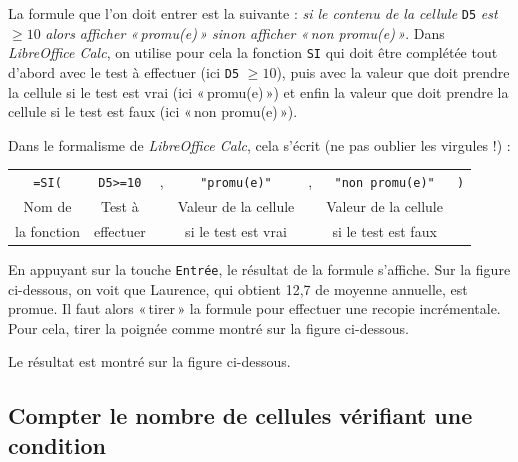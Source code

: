 
La formule que l'on doit entrer est la suivante : \textsl{si le contenu de la cellule} \texttt{D5} \textsl{est} $\geqslant 10$ \textsl{alors afficher «\,promu(e)\,» sinon afficher «\,non promu(e)\,»}. Dans \emph{LibreOffice Calc}, on utilise pour cela la fonction \texttt{SI} qui doit être complétée tout d'abord avec le test à effectuer (ici \texttt{D5} $\geqslant 10$), puis avec la valeur que doit prendre la cellule si le test est vrai (ici «\,promu(e)\,») et enfin la valeur que doit prendre la cellule si le test est faux (ici «\,non promu(e)\,»).

\vspace{1em}

Dans le formalisme de \emph{LibreOffice Calc}, cela s'écrit (ne pas oublier les virgules !) :

\begin{center}
\begin{tabular}{ccccccc}
\texttt{=SI(} & \texttt{D5>=10} & , & \texttt{"promu(e)"} & , & \texttt{"non promu(e)"} & \texttt{)} \\  
Nom de & Test à  & & Valeur de la cellule & & Valeur de la cellule & \\
la fonction & effectuer & &  si le test est vrai & & si le test est faux & \\  
\end{tabular}
\end{center}


En appuyant sur la touche \texttt{Entrée}, le résultat de la formule s'affiche. Sur la figure ci-dessous, on voit que Laurence, qui obtient 12,7 de moyenne annuelle, est promue. Il faut alors «\,tirer\,» la formule pour effectuer une recopie incrémentale. Pour cela, tirer la poignée comme montré sur la figure ci-dessous.


Le résultat est montré sur la figure ci-dessous.


\subsection{Compter le nombre de cellules vérifiant une condition}\label{Calc3NBSI}

